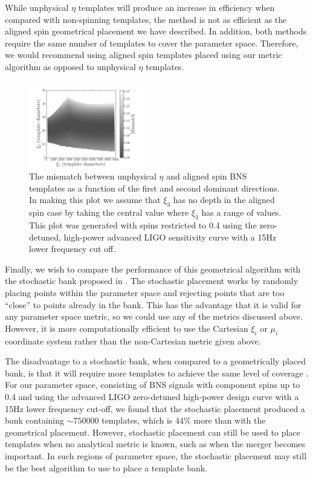While unphysical $\eta$ templates will produce an increase in efficiency when compared with non-spinning templates, the
method is not as efficient as the aligned spin geometrical placement we have described. In addition, both methods
require the same number of templates to cover the parameter space. Therefore, we would recommend using aligned spin templates
placed using our metric algorithm as opposed to unphysical $\eta$ templates.

\begin{figure}
\begin{center}
\includegraphics[width=0.45\textwidth]{papers/bns_spin/figure9.png} 
\end{center}
\caption{\label{fig:unphys_eta} The mismatch between unphysical $\eta$ and
aligned spin BNS templates as a function of the first and second dominant
directions. In making this plot we assume that $\xi_3$
has no depth in the aligned spin case by taking the central value where $\xi_3$ has a range of values.
This plot was generated
with spins restricted to 0.4 using the zero-detuned, high-power advanced LIGO
sensitivity curve with a 15Hz lower frequency cut off. 
}
\end{figure}

Finally, we wish to compare the performance of this geometrical algorithm with the stochastic bank proposed in
\cite{Harry:2009ea,Babak:2008rb}. The stochastic placement works by randomly placing points within the parameter
space and rejecting points that are too ``close'' to points already in the bank. This
has the advantage that it is valid for any parameter space metric, so we could use any of the metrics discussed
above. However, it is more computationally efficient to use the Cartesian $\xi_i$ or $\mu_i$ coordinate system
rather than the non-Cartesian metric given above.

The disadvantage to a stochastic bank, when compared to a geometrically placed bank, is that it will require more
templates to achieve the same level of coverage \cite{Harry:2009ea,Manca:2009xw}.
For our parameter space, consisting of BNS signals with
component spins up to 0.4 and using the advanced LIGO zero-detuned high-power design curve with a 15Hz lower
frequency cut-off,
we found that the stochastic placement
produced a bank containing $\sim 750000$ templates, which is 44\% more than with the geometrical placement.
However, stochastic placement can still be used to place templates when no analytical metric is known, such
as when the merger becomes important. In such regions of parameter space, the stochastic placement may still be the best
algorithm to use to place a template bank.

